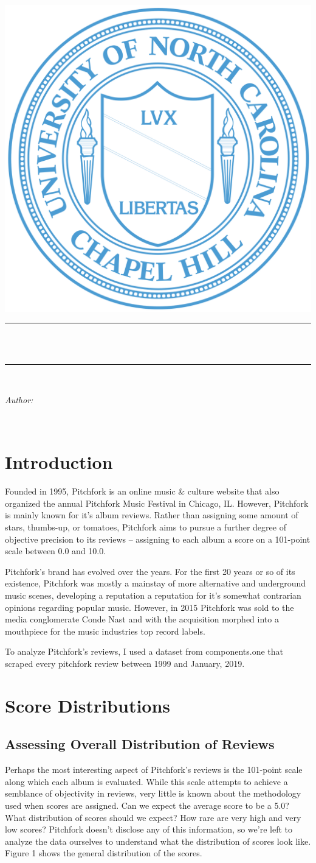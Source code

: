 \documentclass[a4paper,12pt]{article}
\makeatletter
\def\maketitle{
	\begin{center}\leavevmode
		\normalfont
		\vskip 0.5cm   
		\textsc{\large \department}\\
		\vskip 1cm
		\includegraphics[width = 0.4\linewidth]{"unc_seal.png"}
		\vskip 1cm
		\rule{\linewidth}{0.2 mm} \\
		{\large \exam}\\[1 cm]
		{\huge \bfseries \@title \par}
		\vspace{1cm}
		\rule{\linewidth}{0.2 mm} \\[1.5 cm]
		
		\begin{minipage}[t]{0.45\textwidth}
			\begin{flushleft} \large
				\emph{Author:}\\
				\@author
			\end{flushleft}
		\end{minipage}
		\begin{minipage}[t]{0.45\textwidth}
			\begin{flushright} \large
				\ifdefempty{\supervisortwo}{\emph{Instructor:\\}}{\emph{Instructor:\\}}
				\supervisorone\\
				\ifdefempty{\supervisortwo}{}{\supervisortwo\\}
			\end{flushright}
		\end{minipage}
		\vfill
		{\Large \@date\par}
	\end{center}
	\cleardoublepage
}
\makeatother
\begin{document}
	
	
	\maketitle
	
	\tableofcontents

	\newpage
	
	
	
\section{Introduction}
Founded in 1995, Pitchfork is an online music \& culture website that also organized the annual Pitchfork Music Festival in Chicago, IL. However, Pitchfork is mainly known for it's album reviews. Rather than assigning some amount of stars, thumbs-up, or tomatoes, Pitchfork aims to pursue a further degree of objective precision to its reviews -- assigning to each album a score on a 101-point scale between 0.0 and 10.0. 

Pitchfork's brand has evolved over the years. For the first 20 years or so of its existence, Pitchfork was mostly a mainstay of more alternative and underground music scenes, developing a reputation a reputation for it's somewhat contrarian opinions regarding popular music. However, in 2015 Pitchfork was sold to the media conglomerate Conde Nast and with the acquisition morphed into a mouthpiece for the music industries top record labels. 

To analyze Pitchfork's reviews, I used a dataset from components.one that scraped every pitchfork review between 1999 and January, 2019. 



\section{Score Distributions}
\subsection{Assessing Overall Distribution of Reviews}
Perhaps the most interesting aspect of Pitchfork's reviews is the 101-point scale along which each album is evaluated. While this scale attempts to achieve a semblance of objectivity in reviews, very little is known about the methodology used when scores are assigned. Can we expect the average score to be a 5.0? What distribution of scores should we expect? How rare are very high and very low scores? Pitchfork doesn't disclose any of this information, so we're left to analyze the data ourselves to understand what the distribution of scores look like. Figure 1 shows the general distribution of the scores.
\end{document}
